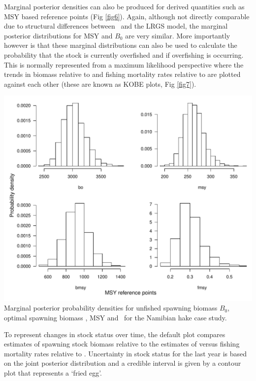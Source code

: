 \begin{multicols}{2}
Marginal posterior densities can also be produced for derived quantities such as MSY based reference points (Fig \ref{fig6}).   Again, although not directly comparable due to structural differences between \iscam\ and the LRGS model, the marginal posterior distributions for MSY and $B_0$ are very similar.  More importantly however is that these marginal distributions can also be used to calculate the probability that the stock is currently overfished and if overfishing is occurring.  This is normally represented from a maximum likelihood perspective where the trends in biomass relative to \bmsy and fishing mortality rates relative to \fmsy are plotted against each other (these are known as KOBE plots, Fig \ref{fig7}).

\begin{figurehere}
	\centering
	\includegraphics[width=0.9\columnwidth]{iscamFigs/nHakerefpoints.pdf}\\
	\caption{Marginal posterior probability densities for unfished spawning biomass $B_0$, optimal spawning biomass \bmsy, MSY and \fmsy\ for the Namibian hake case study.}\label{fig6}
\end{figurehere}

To represent changes in stock status over time, the default plot compares estimates of spawning stock biomass relative to the estimates of \bmsy versus fishing mortality rates relative to \fmsy.  Uncertainty in stock status for the last year is based on the joint posterior distribution and a credible interval is given by a contour plot that represents a `fried egg'.


\end{multicols}
